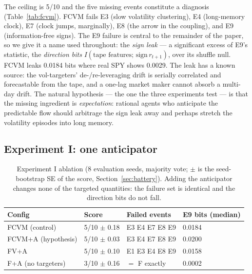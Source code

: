 \documentclass[11pt]{article}
\newcommand{\cfg}[1]{\mbox{#1}}
\begin{document}
The ceiling is 5/10 and the five missing events constitute a diagnosis
(Table~\ref{tab:fcvm}). \cfg{FCVM} fails E3 (slow volatility clustering), E4
(long-memory clock), E7 (clock jumps, marginally), E8 (the arrow in the
coupling), and E9 (information-free signs). The E9 failure is central to the
remainder of the paper, so we give it a name used throughout: the \emph{sign leak} ---
a significant excess of E9's statistic, the \emph{direction bits}
$I(\text{tape features};\, \mathrm{sign}\, r_{t+1})$, over its shuffle null.
\cfg{FCVM} leaks 0.0184 bits where real SPY shows 0.0029. The leak has a
known source: the vol-targeters' de-/re-leveraging drift is serially
correlated and forecastable from the tape, and a one-lag market maker cannot
absorb a multi-day drift. The natural hypothesis --- the one the three
experiments test --- is that the missing ingredient is
\emph{expectation}: rational agents who anticipate the predictable flow should
arbitrage the sign leak away and perhaps stretch the volatility episodes into
long memory.

\subsection{Experiment I: one anticipator}
\label{sec:deca2}

\begin{table}[t]
\centering\small
\begin{tabular}{llll}
\toprule
Config & Score & Failed events & E9 bits (median) \\
\midrule
\cfg{FCVM} (control)      & 5/10 $\pm$ 0.18 & E3 E4 E7 E8 E9 & 0.0184 \\
\cfg{FCVM+A} (hypothesis) & 5/10 $\pm$ 0.03 & E3 E4 E7 E8 E9 & 0.0200 \\
\cfg{FV+A}                & 5/10 $\pm$ 0.10 & E1 E3 E4 E8 E9 & 0.0158 \\
\cfg{F+A} (no targeters)  & 3/10 $\pm$ 0.16 & $=$ \cfg{F} exactly & 0.0002 \\
\bottomrule
\end{tabular}
\caption{Experiment I ablation (8 evaluation seeds, majority vote; $\pm$ is
the seed-bootstrap SE of the score, Section~\ref{sec:battery}). Adding the
anticipator changes none of the targeted quantities: the failure set is
identical and the direction bits do not fall.}
\label{tab:deca2}
\end{table}
\end{document}
